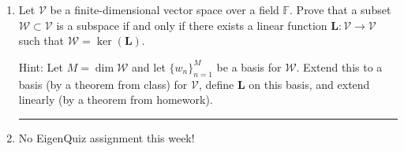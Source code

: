 \documentclass[12pt]{amsart}
\newcommand{\1}{\mathbbm{1}}
\newcounter{Theorem}
\numberwithin{equation}{section}
\numberwithin{Theorem}{section}
\theoremstyle{plain} %
\theoremstyle{definition}
\theoremstyle{remark}
\begin{document}
\begin{enumerate}[1.]
\textit{Note:
The fact that $\mathbf{D}\mathbf{x}=\mathbf{y}$ has a solution for any $\mathbf{y}\in\mathbb{F}^{N-1}$ implies that the image of $\mathbf{D}$ is its codomain.
In general, when this occurs, we say the operator is \textbf{onto (surjective)}.
In this particular instance, we see that any discrete function $\mathbf{y}$ is the discrete derivative of other discrete functions $\mathbf{x}$,
one of which is the discrete integral $\mathbf{S}\mathbf{y}$ of $\mathbf{y}$;
all other solutions are obtained by adding an arbitrary constant discrete function $c\mathbf{1}$ to it.}

\bigskip
\hrule
\bigskip

Using Theorem 2.4(a):
for any $\mathbf{y}\in\mathbb{F}^{N-1}$, the equation
$\mathbf{D}\mathbf{x}=\mathbf{y}$ has a solution
if and only if $\mathbf{y}\in\mathbf{D}(\mathbb{F}^N)$ and that when this occurs
\[\mathbf{x_0} + \operatorname{ker}(\mathbf{D}) = 
	\{\mathbf{x_0} + \mathbf{x} : \mathbf{x}\in\operatorname{ker}(\mathbf{D})\}.\] 

\begin{proof}
	As shown in problem 2
	\begin{equation*}
		\ker(\mathbf{D})
		=\{\mathbf{x}\in\mathbb{F}^N: \mathbf{D}\mathbf{x}=\mathbf{0}\}
		=\{c\mathbf{1}: c\in\mathbb{F}\}.
	\end{equation*}
		
	
	In problem 4 it was shown that 
	$\mathbf{D}(\mathbf{Sy}) = \mathbf{y}$ for all $\mathbf{y}$.
	
	Thus,
	\[\mathbf{x_0} + \operatorname{ker}(\mathbf{D}) = 
		\{\mathbf{x_0} + \mathbf{x} : \mathbf{x}\in\operatorname{ker}(\mathbf{D})\}.\] 
\end{proof}

\bigskip
\hrule
\bigskip

\item Let \(\mathcal{V}\) be a finite-dimensional vector space over a field \(\mathbb{F}\). Prove that a subset \(\mathcal{W}\subset\mathcal{V}\) is a subspace if and only if there exists a linear function \(\mathbf{L}:\mathcal{V}\to\mathcal{V}\) such that \(\mathcal{W}=\operatorname{ker}(\mathbf{L})\). 

Hint: Let \(M = \operatorname{dim}\mathcal{W}\) and let \(\{w_{n}\}_{n=1}^{M}\) be a basis for \(\mathcal{W}\). Extend this to a basis (by a theorem from class) for \(\mathcal{V}\), define \(\mathbf{L}\) on this basis, and extend linearly (by a theorem from homework).


\bigskip
\hrule
\bigskip




\vspace*{\fill}
\item No EigenQuiz assignment this week!

\end{enumerate}
\end{document}
